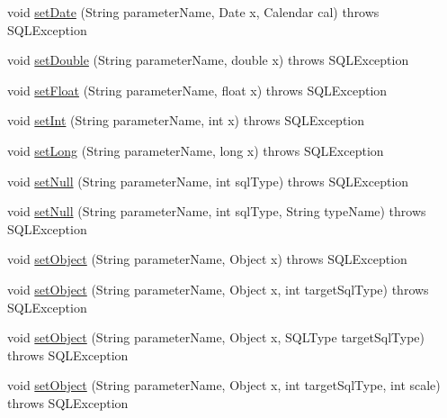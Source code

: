 \begin{DoxyCompactItemize}
\item 
void \mbox{\hyperlink{classcom_1_1mysql_1_1cj_1_1jdbc_1_1_callable_statement_a4acf89e04d11195ab7c45dce46e7c367}{set\+Date}} (String parameter\+Name, Date x, Calendar cal)  throws S\+Q\+L\+Exception 
\item 
void \mbox{\hyperlink{classcom_1_1mysql_1_1cj_1_1jdbc_1_1_callable_statement_abd5c1f562e6a0f06c4ef239a208d1471}{set\+Double}} (String parameter\+Name, double x)  throws S\+Q\+L\+Exception 
\item 
void \mbox{\hyperlink{classcom_1_1mysql_1_1cj_1_1jdbc_1_1_callable_statement_a419e74b589c54323627a2dbace2148c9}{set\+Float}} (String parameter\+Name, float x)  throws S\+Q\+L\+Exception 
\item 
void \mbox{\hyperlink{classcom_1_1mysql_1_1cj_1_1jdbc_1_1_callable_statement_a7b7f13ec6ca2fe9dc40472b5334d1259}{set\+Int}} (String parameter\+Name, int x)  throws S\+Q\+L\+Exception 
\item 
void \mbox{\hyperlink{classcom_1_1mysql_1_1cj_1_1jdbc_1_1_callable_statement_a1b79292eddc7df78b2ef1b7e9ea614ed}{set\+Long}} (String parameter\+Name, long x)  throws S\+Q\+L\+Exception 
\item 
void \mbox{\hyperlink{classcom_1_1mysql_1_1cj_1_1jdbc_1_1_callable_statement_a75fd7895affb02fdb0d77a4093554b89}{set\+Null}} (String parameter\+Name, int sql\+Type)  throws S\+Q\+L\+Exception 
\item 
void \mbox{\hyperlink{classcom_1_1mysql_1_1cj_1_1jdbc_1_1_callable_statement_a3358832780f6cdacf23551c4321bf35f}{set\+Null}} (String parameter\+Name, int sql\+Type, String type\+Name)  throws S\+Q\+L\+Exception 
\item 
void \mbox{\hyperlink{classcom_1_1mysql_1_1cj_1_1jdbc_1_1_callable_statement_a2a37988196c65bd7d26890a1fe33281b}{set\+Object}} (String parameter\+Name, Object x)  throws S\+Q\+L\+Exception 
\item 
void \mbox{\hyperlink{classcom_1_1mysql_1_1cj_1_1jdbc_1_1_callable_statement_a43a0be416f90c7c642fc33122bbccfb1}{set\+Object}} (String parameter\+Name, Object x, int target\+Sql\+Type)  throws S\+Q\+L\+Exception 
\item 
void \mbox{\hyperlink{classcom_1_1mysql_1_1cj_1_1jdbc_1_1_callable_statement_a9236a7d2f476d95497910b71db906c07}{set\+Object}} (String parameter\+Name, Object x, S\+Q\+L\+Type target\+Sql\+Type)  throws S\+Q\+L\+Exception 
\item 
void \mbox{\hyperlink{classcom_1_1mysql_1_1cj_1_1jdbc_1_1_callable_statement_a5b8dc26448026aec39c4e87831d1e045}{set\+Object}} (String parameter\+Name, Object x, int target\+Sql\+Type, int scale)  throws S\+Q\+L\+Exception 

\end{DoxyCompactItemize}
